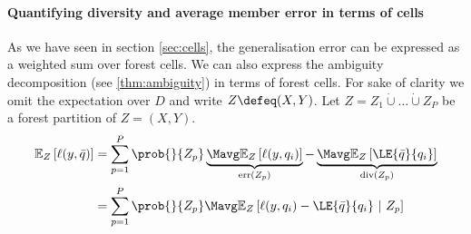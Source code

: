 \documentclass[
    a4paper, %
	fontsize=10pt, %
	twoside=false, %
]{kaobook}
\begin{document}
\paragraph{Quantifying diversity and average member error in terms of cells} As we have seen in section \ref{sec:cells}, the generalisation error can be expressed as a weighted sum over forest cells. 
We can also express the ambiguity decomposition (see \ref{thm:ambiguity}) in terms of forest cells.
For sake of clarity we omit the expectation over $D$ and write $Z \defeq (X,Y)$.  Let
$Z = Z_{1} \dot\cup \dots \dot\cup Z_{P}$ be a forest partition of $Z=(X,Y)$.
\begin{align*}
\mathbb{E}_{Z}\left[ \ell(y, \bar{q}) \right]  &= \sum_{p=1}^P \prob{}{Z_{p}}  
\underbrace{
\Mavg \mathbb{E}_{Z}\left[ \ell(y,q_{i})  \right] 
 }_{\text{err}(Z_p) }
 -  
 \underbrace{
\Mavg \mathbb{E}_{Z}\left[ \LE{\bar{q}}{q_{i}} \right]   
}_{\text{div}(Z_p) } 
\\
&= \sum_{p=1}^P \prob{}{Z_{p}} \Mavg \mathbb{E}_{Z}\left[ \ell(y,q_{i}) - \LE{\bar{q}}{q_{i}} ~|~ Z_p \right] 
\end{align*}
\end{document}
